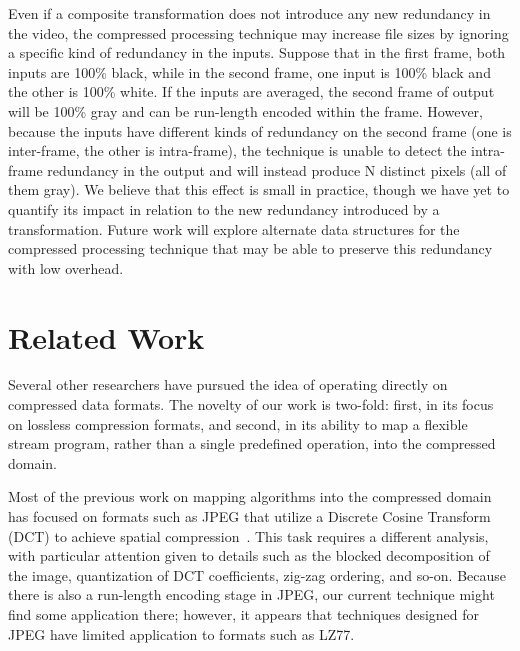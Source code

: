 Even if a composite transformation does not introduce any new
redundancy in the video, the compressed processing technique may
increase file sizes by ignoring a specific kind of redundancy in the
inputs.  Suppose that in the first frame, both inputs are 100\% black,
while in the second frame, one input is 100\% black and the other is
100\% white.  If the inputs are averaged, the second frame of output
will be 100\% gray and can be run-length encoded within the frame.
However, because the inputs have different kinds of redundancy on the
second frame (one is inter-frame, the other is intra-frame), the
technique is unable to detect the intra-frame redundancy in the output
and will instead produce N distinct pixels (all of them gray).  We
believe that this effect is small in practice, though we have yet to
quantify its impact in relation to the new redundancy introduced by a
transformation.  Future work will explore alternate data structures
for the compressed processing technique that may be able to preserve
this redundancy with low overhead.

\section{Related Work}
\label{sec:related}

Several other researchers have pursued the idea of operating directly
on compressed data formats.  The novelty of our work is two-fold:
first, in its focus on lossless compression formats, and second, in
its ability to map a flexible stream program, rather than a single
predefined operation, into the compressed domain.

Most of the previous work on mapping algorithms into the compressed
domain has focused on formats such as JPEG that utilize a Discrete
Cosine Transform (DCT) to achieve spatial
compression~\cite{shen96,shen96b,smith96b,smith98,shen98,vasudev98,nang00,dorai00,dugad01,mukherjee02,feng03}.
This task requires a different analysis, with particular attention
given to details such as the blocked decomposition of the image,
quantization of DCT coefficients, zig-zag ordering, and so-on.
Because there is also a run-length encoding stage in JPEG, our current
technique might find some application there; however, it appears that
techniques designed for JPEG have limited application to formats such
as LZ77.  

